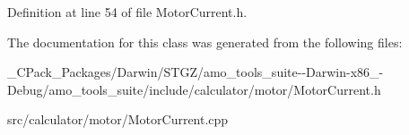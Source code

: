Definition at line 54 of file Motor\+Current.\+h.



The documentation for this class was generated from the following files\+:\begin{DoxyCompactItemize}
\item 
\+\_\+\+C\+Pack\+\_\+\+Packages/\+Darwin/\+S\+T\+G\+Z/amo\+\_\+tools\+\_\+suite-\/-\/\+Darwin-\/x86\+\_-\/\+Debug/amo\+\_\+tools\+\_\+suite/include/calculator/motor/Motor\+Current.\+h\item 
src/calculator/motor/Motor\+Current.\+cpp\end{DoxyCompactItemize}
